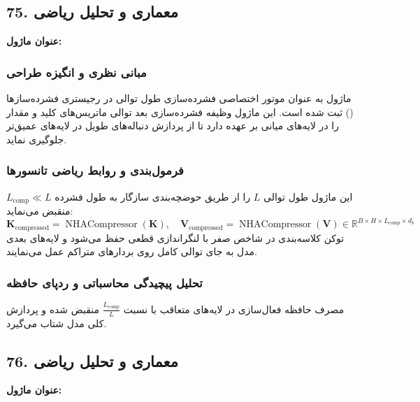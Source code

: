 \subsection*{75. معماری و تحلیل ریاضی }
\textbf{عنوان ماژول:} 

\subsubsection*{مبانی نظری و انگیزه طراحی}
ماژول  به عنوان موتور اختصاصی فشرده‌سازی طول توالی در رجیستری فشرده‌سازها () ثبت شده است. این ماژول وظیفه فشرده‌سازی بعد توالی ماتریس‌های کلید و مقدار را در لایه‌های میانی بر عهده دارد تا از پردازش دنباله‌های طویل در لایه‌های عمیق‌تر جلوگیری نماید.

\subsubsection*{فرمول‌بندی و روابط ریاضی تانسورها}
این ماژول طول توالی $L$ را از طریق حوضچه‌بندی سازگار به طول فشرده $L_{\text{comp}} \ll L$ منقبض می‌نماید:
\begin{equation}
\mathbf{K}_{\text{compressed}} = \operatorname{NHACompressor}(\mathbf{K}), \quad \mathbf{V}_{\text{compressed}} = \operatorname{NHACompressor}(\mathbf{V}) \in \mathbb{R}^{B \times H \times L_{\text{comp}} \times d_k}
\end{equation}
توکن کلاسه‌بندی در شاخص صفر با لنگراندازی قطعی حفظ می‌شود و لایه‌های بعدی مدل به جای توالی کامل روی بردارهای متراکم عمل می‌نمایند.

\subsubsection*{تحلیل پیچیدگی محاسباتی و ردپای حافظه}
مصرف حافظه فعال‌سازی در لایه‌های متعاقب با نسبت $\frac{L_{\text{comp}}}{L}$ منقبض شده و پردازش کلی مدل شتاب می‌گیرد.


\subsection*{76. معماری و تحلیل ریاضی }
\textbf{عنوان ماژول:} 


